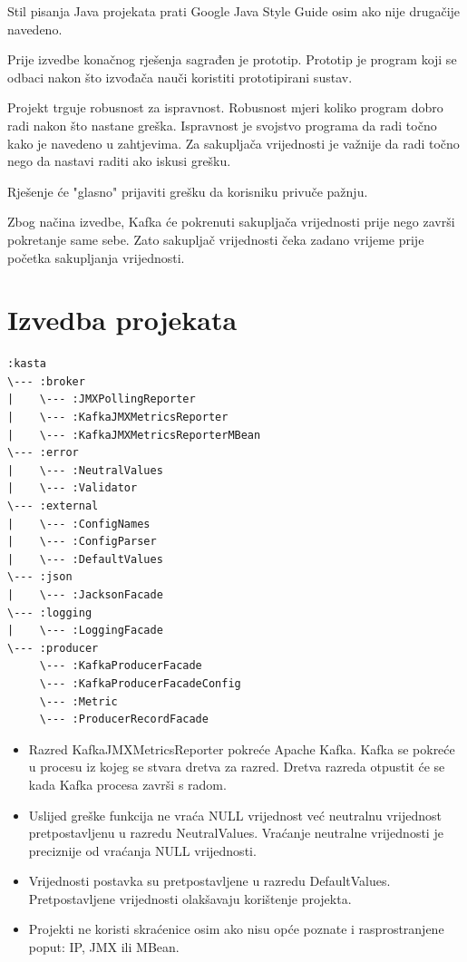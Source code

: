 \documentclass[utf8, diplomski, lmodern, numeric]{fer}
\begin{document}
Stil pisanja Java projekata prati Google Java Style Guide osim ako nije drugačije navedeno.

\newpage
Prije izvedbe konačnog rješenja sagrađen je prototip. Prototip je program koji se odbaci nakon što izvođača nauči koristiti prototipirani sustav.

Projekt trguje robusnost za ispravnost. Robusnost mjeri koliko program dobro radi nakon što nastane greška. Ispravnost je svojstvo programa da radi točno kako je navedeno u zahtjevima. Za sakupljača vrijednosti je važnije da radi točno nego da nastavi raditi ako iskusi grešku.

Rješenje će "glasno" prijaviti grešku da korisniku privuče pažnju. 

Zbog načina izvedbe, Kafka će pokrenuti sakupljača vrijednosti prije nego završi pokretanje same sebe. Zato sakupljač vrijednosti čeka zadano vrijeme prije početka sakupljanja vrijednosti.


\section{Izvedba projekata}

\begin{lstlisting}[floatplacement=H]
:kasta
\--- :broker
|    \--- :JMXPollingReporter
|    \--- :KafkaJMXMetricsReporter
|    \--- :KafkaJMXMetricsReporterMBean
\--- :error
|    \--- :NeutralValues
|    \--- :Validator
\--- :external
|    \--- :ConfigNames
|    \--- :ConfigParser
|    \--- :DefaultValues
\--- :json
|    \--- :JacksonFacade
\--- :logging
|    \--- :LoggingFacade
\--- :producer
     \--- :KafkaProducerFacade
     \--- :KafkaProducerFacadeConfig
     \--- :Metric
     \--- :ProducerRecordFacade
\end{lstlisting}

\begin{itemize}
    \item Razred KafkaJMXMetricsReporter pokreće Apache Kafka. Kafka se pokreće u procesu iz kojeg se stvara dretva za razred. Dretva razreda otpustit će se kada Kafka procesa završi s radom.
    \item Uslijed greške funkcija ne vraća NULL vrijednost već neutralnu vrijednost pretpostavljenu u razredu NeutralValues. Vraćanje neutralne vrijednosti je preciznije od vraćanja NULL vrijednosti.
    \item Vrijednosti postavka su pretpostavljene u razredu DefaultValues. Pretpostavljene vrijednosti olakšavaju korištenje projekta.
    \item Projekti ne koristi skraćenice osim ako nisu opće poznate i rasprostranjene poput: IP, JMX ili MBean.
\end{itemize}
\end{document}
